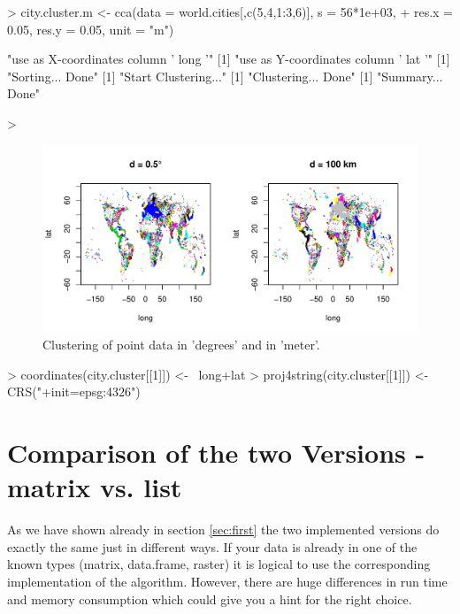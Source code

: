 \documentclass[10pt,a4paper]{article}
\begin{document}
\begin{Schunk}
\begin{Sinput}
> city.cluster.m <- cca(data = world.cities[,c(5,4,1:3,6)], s = 56*1e+03,
+                       res.x = 0.05, res.y = 0.05, unit = "m")
\end{Sinput}
\begin{Soutput}
[1] "use as X-coordinates column ' long '"
[1] "use as Y-coordinates column ' lat '"
[1] "Sorting... Done"
[1] "Start Clustering..."
[1] "Clustering... Done"
[1] "Summary... Done"
\end{Soutput}
\begin{Sinput}
> 
\end{Sinput}
\end{Schunk}


\begin{figure}
\centering
\includegraphics[width=\textwidth]{pics/point_data.pdf}
\caption{Clustering of point data in 'degrees' and in 'meter'.}
\label{fig:landcover}
\end{figure}

\begin{Schunk}
\begin{Sinput}
>   coordinates(city.cluster[[1]]) <- ~long+lat
>   proj4string(city.cluster[[1]]) <- CRS("+init=epsg:4326")
\end{Sinput}
\end{Schunk}

\section{Comparison of the two Versions - matrix vs. list}
\label{sec:compare}

As we have shown already in section \ref{sec:first} the two implemented versions do exactly the same just in different ways. If your data is already in one of the known types (matrix, data.frame, raster) it is logical to use the corresponding implementation of the algorithm. However, there are huge differences in run time and memory consumption which could give you a hint for the right choice.
\end{document}
